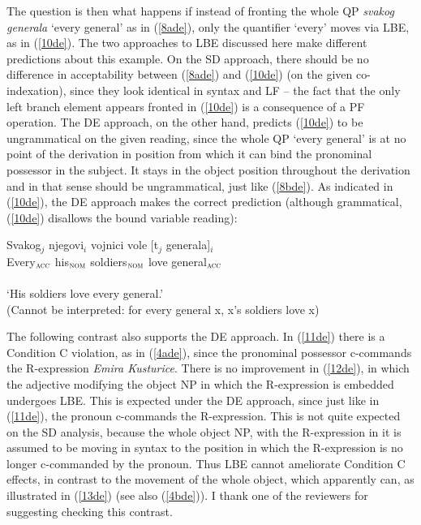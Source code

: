 \documentclass[
    output=paper,
    colorlinks,
    citecolor=brown,
]{langscibook}
\begin{document}
The question is then what happens if instead of fronting the whole QP \textit{svakog generala} ‘every general’ as in (\ref{8ade}), only the quantifier ‘every’ moves via LBE, as in (\ref{10de}). The two approaches to LBE discussed here make different predictions about this example. On the SD approach, there should be no difference in acceptability between (\ref{8ade}) and (\ref{10de}) (on the given co-indexation), since they look identical in syntax and LF  – the fact that the only left branch element appears fronted in (\ref{10de}) is a consequence of a PF operation. The DE approach, on the other hand, predicts (\ref{10de}) to be ungrammatical on the given reading, since the whole QP ‘every general’ is at no point of the derivation in position from which it can bind the pronominal possessor in the subject. It stays in the object position throughout the derivation and in that sense should be ungrammatical, just like (\ref{8bde}). As indicated in (\ref{10de}), the DE approach makes the correct prediction (although grammatical, (\ref{10de}) disallows the bound variable reading): 

\begin{exe}
\ex \label{10de}
\gll *Svakog$_{j}$   njegovi$_{i}$ vojnici vole     [t$_{j}$ generala]$_{i}$\\
Every$_{\textsc{acc}}$ his$_{\textsc{nom}}$ soldiers$_{\textsc{nom}}$ love {} general$_{\textsc{acc}}$\\\\
‘His soldiers love every general.’\\
(Cannot be interpreted: for every general x, x’s soldiers love x) 
\end{exe}

The following contrast also supports the DE approach. In (\ref{11de}) there is a Condition C violation, as in (\ref{4ade}), since the pronominal possessor c-commands the R-expression \textit{Emira Kusturice}. There is no improvement in (\ref{12de}), in which the adjective modifying the object NP in which the R-expression is embedded undergoes LBE. This is expected under the DE approach, since just like in (\ref{11de}), the pronoun c-commands the R-expression. This is not quite expected on the SD analysis, because the whole object NP, with the R-expression in it is assumed to be moving in syntax to the position in which the R-expression is no longer c-commanded by the pronoun. Thus LBE cannot ameliorate Condition C effects, in contrast to the movement of the whole object, which apparently can, as illustrated in (\ref{13de}) (see also (\ref{4bde})). I thank one of the reviewers for suggesting checking this contrast. 
\end{document}
